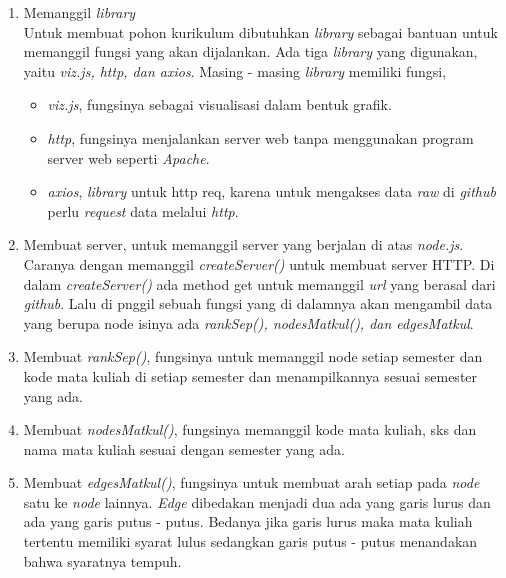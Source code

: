 \begin{enumerate}
\item Memanggil \textit{library}\\
Untuk membuat pohon kurikulum dibutuhkan \textit{library} sebagai bantuan untuk memanggil fungsi yang akan dijalankan. Ada tiga \textit{library} yang digunakan, yaitu \textit{viz.js, http, dan axios}. Masing - masing \textit{library} memiliki fungsi,
\begin{itemize}
\item \textit{viz.js}, fungsinya sebagai visualisasi dalam bentuk grafik.
\item \textit{http}, fungsinya menjalankan server web tanpa menggunakan program server web seperti \textit{Apache}. 
\item \textit{axios}, \textit{library} untuk http req, karena untuk mengakses data \textit{raw} di \textit{github} perlu \textit{request} data melalui \textit{http}.
\end{itemize} 
\item Membuat server, untuk memanggil server yang berjalan di atas \textit{node.js}. Caranya dengan memanggil \textit{createServer()} untuk membuat server HTTP. Di dalam \textit{createServer()} ada method get untuk memanggil \textit{url} yang berasal dari \textit{github}. Lalu di pnggil sebuah fungsi yang di dalamnya akan mengambil data yang berupa node isinya ada \textit{rankSep(), nodesMatkul(), dan edgesMatkul}.
\item Membuat \textit{rankSep()}, fungsinya untuk memanggil node setiap semester dan kode mata kuliah di setiap semester dan menampilkannya sesuai semester yang ada.
\item Membuat \textit{nodesMatkul()}, fungsinya memanggil kode mata kuliah, sks dan nama mata kuliah sesuai dengan semester yang ada. 
\item Membuat \textit{edgesMatkul()}, fungsinya untuk membuat arah setiap pada \textit{node} satu ke \textit{node} lainnya. \textit{Edge} dibedakan menjadi dua ada yang garis lurus dan ada yang garis putus - putus. Bedanya jika garis lurus maka mata kuliah tertentu memiliki syarat lulus sedangkan garis putus - putus menandakan bahwa syaratnya tempuh.

\end{enumerate}



